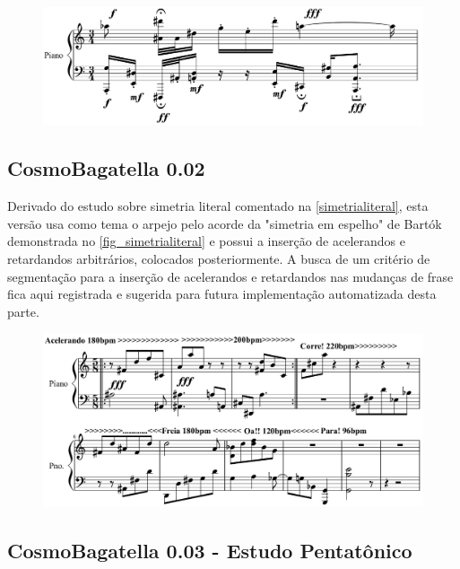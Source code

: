 \documentclass[
	12pt,				%
	openright,			%
	twoside,			%
	a4paper,			%
	english,			%
	french,				%
	spanish,			%
	brazil				%
	]{abntex2}
\begin{document}
\begin{figure}[!h]
	\begin{center}
	    \includegraphics*[scale=0.4]{score/CosmoBagatella001.png}
	\end{center}
\end{figure}


\subsection{CosmoBagatella 0.02}

Derivado do estudo sobre simetria literal comentado na \autoref{simetrialiteral}, esta versão usa como tema o arpejo pelo acorde da "simetria em espelho" de Bartók demonstrada no \autoref{fig_simetrialiteral} e possui a inserção de acelerandos e retardandos arbitrários, colocados posteriormente. A busca de um critério de segmentação para a inserção de acelerandos e retardandos nas mudanças de frase fica aqui registrada e sugerida para futura implementação automatizada desta parte.


\begin{figure}[!h]
	\begin{center}
	    \includegraphics*[scale=0.4]{score/CosmoBagatella002.png}
	\end{center}
\end{figure}

\subsection{CosmoBagatella 0.03 - Estudo Pentatônico}
\end{document}
